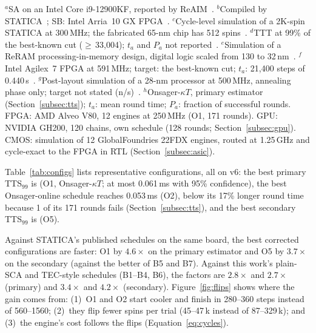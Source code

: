 \begin{table}[t]
\begin{minipage}{\textwidth}
$^{a}$SA on an Intel Core i9-12900KF, reported by ReAIM~\cite{10609617}.
$^{b}$Compiled by STATICA~\cite{yamamoto2021statica}; SB: Intel Arria~10 GX FPGA~\cite{goto2019combinatorial}.
$^{c}$Cycle-level simulation of a 2K-spin STATICA at 300\,MHz; the fabricated 65-nm chip has 512 spins~\cite{yamamoto2021statica}.
$^{d}$TTT at 99\% of the best-known cut ($\geq$\,33{,}004); $t_a$ and $P_a$ not reported~\cite{goto2021high}.
$^{e}$Simulation of a ReRAM processing-in-memory design, digital logic scaled from 130 to 32\,nm~\cite{10609617}.
$^{f}$Intel Agilex~7 FPGA at 591\,MHz; target: the best-known cut; $t_a$: 21{,}400 steps of 0.440\,\textmu s~\cite{goto2026edge}.
$^{g}$Post-layout simulation of a 28-nm processor at 500\,MHz, annealing phase only; target not stated (n/s)~\cite{onizawa2026dssa}.
$^{h}$Onsager-$\kappa T$, primary estimator (Section~\ref{subsec:tts}); $t_a$: mean round time; $P_a$: fraction of successful rounds. FPGA: AMD Alveo V80, 12 engines at 250\,MHz (O1, 171 rounds). GPU: NVIDIA GH200, 120 chains, own schedule (128 rounds; Section~\ref{subsec:gpu}). CMOS: simulation of 12 GlobalFoundries 22FDX engines, routed at 1.25\,GHz and cycle-exact to the FPGA in RTL (Section~\ref{subsec:asic}).
\end{minipage}
\vspace{-0.6em}%
\end{table}

Table~\ref{tab:configs} lists representative configurations, all on v6: the best primary TTS$_{99}$ is \ttsP{} (O1, Onsager-$\kappa T$; at most 0.061\,ms with 95\% confidence), the best Onsager-online schedule reaches 0.053\,ms (O2), below its 17\% longer round time because 1 of its 171 rounds fails (Section~\ref{subsec:tts}), and the best secondary TTS$_{99}$ is \ttsS{} (O5).

Against STATICA's published schedules on the same board, the best corrected configurations are faster: O1 by $4.6\times$ on the primary estimator and O5 by $3.7\times$ on the secondary (against the better of B5 and B7). Against this work's plain-SCA and TEC-style schedules (B1--B4, B6), the factors are $2.8\times$ and $2.7\times$ (primary) and $3.4\times$ and $4.2\times$ (secondary).
Figure~\ref{fig:flips} shows where the gain comes from: (1)~O1 and O2 start cooler and finish in 280--360 steps instead of 560--1560; (2)~they flip fewer spins per trial (45--47\,k instead of 87--329\,k); and (3)~the engine's cost follows the flips (Equation~\eqref{eq:cycles}).

